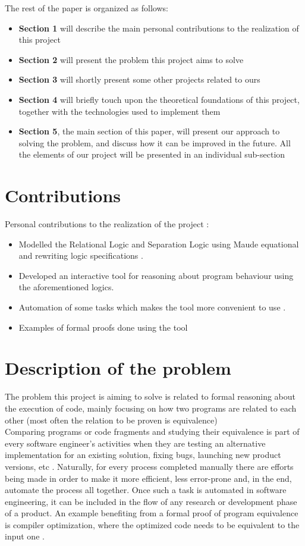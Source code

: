 \documentclass[12pt,a4paper]{article}
\begin{document}
The rest of the paper is organized as follows: 
\begin{itemize}
	\item {\textbf{Section 1} will describe the main personal contributions to the realization of this project}
	\item {\textbf{Section 2} will present the problem this project aims to solve}
	\item {\textbf{Section 3} will shortly present some other projects related to ours}
	\item {\textbf{Section 4} will briefly touch upon the theoretical foundations of this project, together with the technologies used to implement them}
	\item {\textbf{Section 5}, the main section of this paper, will present our approach to solving the problem, and discuss how it can be improved in the future. All the elements of our project will be presented in an individual sub-section}
\end{itemize}

\section{Contributions}
Personal contributions to the realization of the project : 
\begin{itemize}
	\item Modelled the Relational Logic and Separation Logic using Maude equational and rewriting logic specifications . 
	\item Developed an interactive tool for reasoning about program behaviour using the aforementioned logics.
	\item Automation of some tasks which makes the tool more convenient to use .
	\item Examples of formal proofs done using the tool
\end{itemize}
\section{Description of the problem}
The problem this project is aiming to solve is related to formal reasoning about the execution of code, mainly focusing on how two programs are related to each other (most often the relation to be proven is equivalence)\\

Comparing programs or code fragments and studying their equivalence is part of every software engineer's activities when they are testing an alternative implementation for an existing solution, fixing bugs, launching new product versions, etc . Naturally, for every process completed manually there are efforts being made in order to make it more efficient, less error-prone and, in the end, automate the process all together. Once such a task is automated in software engineering, it can be included in the flow of any research or development phase of a product. An example benefiting from a formal proof of program equivalence is compiler optimization, where the optimized code needs to be equivalent to the input one . \\
\end{document}
